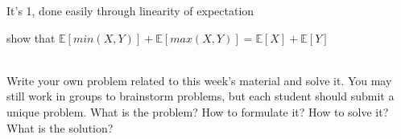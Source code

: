 \documentclass[]{article}
\begin{document}
\begin{qunlist}



It's 1, done easily through linearity of expectation



 
 show that $\mathbb{E}[min(X,Y)] + \mathbb{E}[max(X,Y)] = \mathbb{E}[X] + \mathbb{E}[Y]$



 \\
Write your own problem related to this week's material and solve it. You may still work in groups to brainstorm problems, but each student should submit a unique problem. What is the problem? How to formulate it? How to solve it? What is the solution?
    
\end{qunlist}
\end{document}
